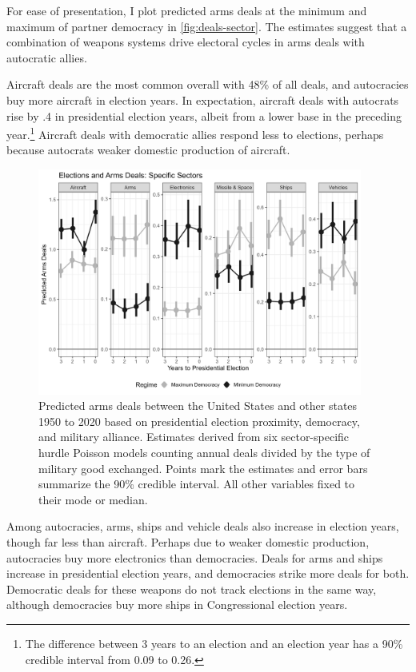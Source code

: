 \documentclass[12pt]{article}
\begin{document}
For ease of presentation, I plot predicted arms deals at the minimum and maximum of partner democracy in \autoref{fig:deals-sector}.
The estimates suggest that a combination of weapons systems drive electoral cycles in arms deals with autocratic allies.  


Aircraft deals are the most common overall with 48\% of all deals, and autocracies buy more aircraft in election years.
In expectation, aircraft deals with autocrats rise by .4 in presidential election years, albeit from a lower base in the preceding year.\footnote{The difference between 3 years to an election and an election year has a 90\% credible interval from 0.09 to 0.26.}
Aircraft deals with democratic allies respond less to elections, perhaps because autocrats weaker domestic production of aircraft. 


\begin{figure}[htpb]
	\centering
		\includegraphics[width=0.95\textwidth]{../figures/deals-sector.png}
	\caption{Predicted arms deals between the United States and other states 1950 to 2020 based on presidential election proximity, democracy, and military alliance. Estimates derived from six sector-specific hurdle Poisson models counting annual deals divided by the type of military good exchanged. Points mark the estimates and error bars summarize the 90\% credible interval. All other variables fixed to their mode or median.}
	\label{fig:deals-sector}
\end{figure}


Among autocracies, arms, ships and vehicle deals also increase in election years, though far less than aircraft. 
Perhaps due to weaker domestic production, autocracies buy more electronics than democracies. 
Deals for arms and ships increase in presidential election years, and democracies strike more deals for both.  
Democratic deals for these weapons do not track elections in the same way, although democracies buy more ships in Congressional election years. 
\end{document}
